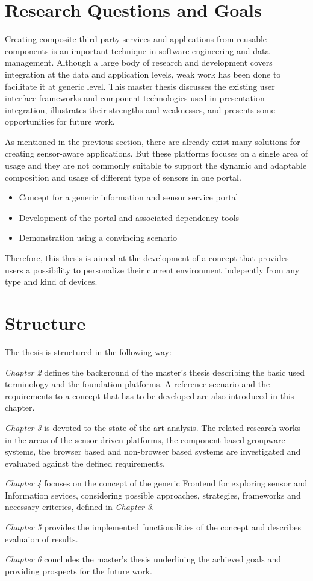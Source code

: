 \section{Research Questions and Goals}
     Creating composite third-party services and applications from reusable components 
     is an important technique in software engineering and data management. Although a large body
     of research and development covers integration at the data and application levels,
     weak work has been done to facilitate it at generic level. This master thesis
     discusses the existing user interface frameworks and component technologies
     used in presentation integration, illustrates their strengths and weaknesses, and
     presents some opportunities for future work.

     As mentioned in the previous section, there are already exist many solutions
     for creating sensor-aware applications. But these platforms focuses on a single area of usage and they are not commonly suitable to support the dynamic and adaptable composition and usage of different type of sensors in one portal.

\begin{itemize}
\item Concept for a generic information and sensor service portal
\item Development of the portal and associated dependency tools
\item Demonstration using a convincing scenario
\end{itemize}

     Therefore, this thesis is aimed at the development of a concept that provides users a possibility to personalize their current environment indepently from any type and kind of devices.

\section{Structure}

The thesis is structured in the following way:

\emph{Chapter 2} defines the background of the master’s thesis
     describing the basic used terminology and the foundation platforms. A reference scenario and the requirements to a concept that has to be developed are also introduced in this chapter.

\emph{Chapter 3} is devoted to the state of the art analysis. The related research
     works in the areas of the sensor-driven platforms, the component based
     groupware systems, the browser based and non-browser based systems
     are investigated and evaluated against the defined requirements.

\emph{Chapter 4} focuses on the concept of the generic Frontend for exploring sensor and Information 
     sevices, considering possible approaches, strategies, frameworks and necessary criteries, defined in \emph{Chapter 3}.

\emph{Chapter 5} provides the implemented functionalities of the concept and describes evaluaion of results.

\emph{Chapter 6} concludes the master’s thesis underlining the achieved goals
     and providing prospects for the future work.
